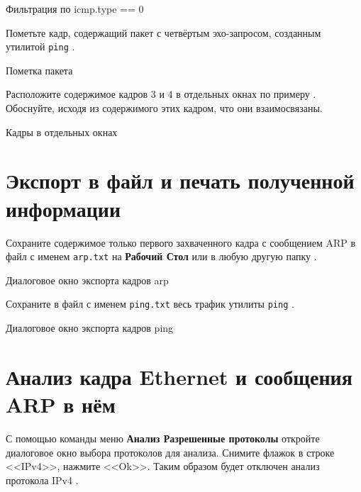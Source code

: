 \begin{image}
	\caption{Фильтрация по icmp.type == 0}
	\label{fig:wrsh:filter:icmp:seq}
\end{image}

Пометьте кадр, содержащий пакет с четвёртым эхо-запросом,
созданным утилитой \texttt{ping} .

\begin{image}
	\caption{Пометка пакета}
	\label{fig:wrsh:mark}
\end{image}

Расположите содержимое кадров 3 и 4
в отдельных окнах по примеру .
Обоснуйте, исходя из содержимого этих кадром, что они взаимосвязаны.

\begin{image}
	\caption{Кадры в отдельных окнах}
	\label{fig:wrsh:window:split}
\end{image}

\section{Экспорт в файл и печать полученной информации}

Сохраните содержимое только первого захваченного кадра с сообщением ARP
в файл с именем \texttt{arp.txt} на \textbf{Рабочий Стол}
или в любую другую папку .

\begin{image}
	\caption{Диалоговое окно экспорта кадров arp}
	\label{fig:wrsh:save:arp}
\end{image}

Сохраните в файл с именем \texttt{ping.txt}
весь трафик утилиты \texttt{ping} .

\begin{image}
	\caption{Диалоговое окно экспорта кадров ping}
	\label{fig:wrsh:save:ping}
\end{image}

\section{Анализ кадра Ethernet и сообщения ARP в нём}

С помощью команды меню \textbf{Анализ \rarrow Разрешенные протоколы}
откройте диалоговое окно выбора протоколов для анализа.
Снимите флажок в строке <<IPv4>>, нажмите <<Ok>>.
Таким образом будет отключен анализ протокола IPv4
.


